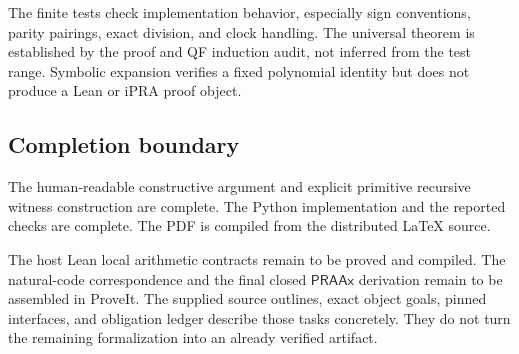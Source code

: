 The finite tests check implementation behavior, especially sign conventions,
parity pairings, exact division, and clock handling. The universal theorem
is established by the proof and QF induction audit, not inferred from the
test range. Symbolic expansion verifies a fixed polynomial identity but
does not produce a Lean or iPRA proof object.

\subsection{Completion boundary}

The human-readable constructive argument and explicit primitive recursive
witness construction are complete. The Python implementation and the
reported checks are complete. The PDF is compiled from the distributed
LaTeX source.

The host Lean local arithmetic contracts remain to be proved and compiled.
The natural-code correspondence and the final closed
$\mathsf{PRAAx}$ derivation remain to be assembled in ProveIt. The supplied
source outlines, exact object goals, pinned interfaces, and obligation
ledger describe those tasks concretely. They do not turn the remaining
formalization into an already verified artifact.
